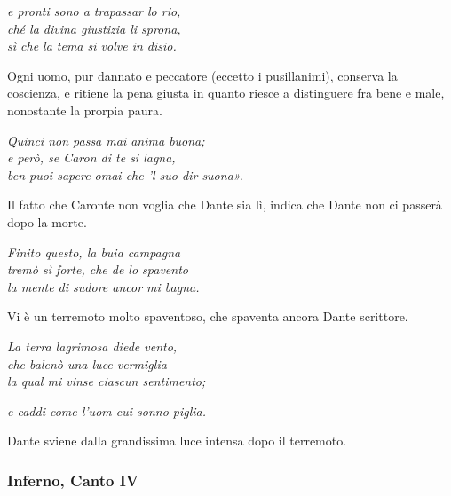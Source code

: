 \documentclass[a4paper]{article}
\newcommand\hr{\par\vspace{-.5\ht\strutbox}\noindent\hrulefill\par\vspace{0.15cm}}
\begin{document}
\begin{center}
    \textit{e pronti sono a trapassar lo rio,} \\
    \textit{ché la divina giustizia li sprona,} \\
    \textit{sì che la tema si volve in disio.}
\end{center}

Ogni uomo, pur dannato e peccatore (eccetto i pusillanimi),
conserva la coscienza, e ritiene la pena giusta in quanto riesce a distinguere fra bene e male,
nonostante la prorpia paura.

\begin{center}
    \textit{Quinci non passa mai anima buona;} \\
    \textit{e però, se Caron di te si lagna,} \\
    \textit{ben puoi sapere omai che 'l suo dir suona».}
\end{center}

Il fatto che Caronte non voglia che Dante sia lì, indica che Dante non ci passerà dopo la morte.

\hr

\begin{center}
    \textit{Finito questo, la buia campagna} \\
    \textit{tremò sì forte, che de lo spavento} \\
    \textit{la mente di sudore ancor mi bagna.}
\end{center}

Vi è un terremoto molto spaventoso, che spaventa ancora Dante scrittore.

\begin{center}
    \textit{La terra lagrimosa diede vento,} \\
    \textit{che balenò una luce vermiglia} \\
    \textit{la qual mi vinse ciascun sentimento;}
\end{center}

\begin{center}
    \textit{e caddi come l'uom cui sonno piglia.} \\
\end{center}

Dante sviene dalla grandissima luce intensa dopo il terremoto.

\subsubsection{Inferno, Canto IV}
\end{document}
